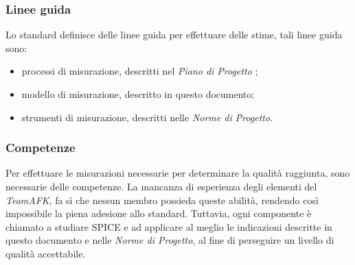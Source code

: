 \subsubsection{Linee guida}
Lo standard definisce delle linee guida per effettuare delle stime, tali linee guida sono:
\begin{itemize}
	\item processi di misurazione, descritti nel \textit{Piano di Progetto} ;
	\item modello di misurazione, descritto in questo documento;
	\item strumenti di misurazione, descritti nelle \textit{Norme di Progetto}.
\end{itemize}

\subsubsection{Competenze}
Per effettuare le misurazioni necessarie per determinare la qualità raggiunta, sono necessarie delle competenze. La mancanza di esperienza degli elementi del \textit{TeamAFK}, fa sì che nessun membro possieda queste abilità, rendendo così impossibile la piena adesione allo standard. Tuttavia, ogni componente è chiamato a studiare SPICE e ad applicare al meglio le indicazioni descritte in questo documento e nelle \textit{Norme di Progetto}, al fine di perseguire un livello di qualità accettabile.







